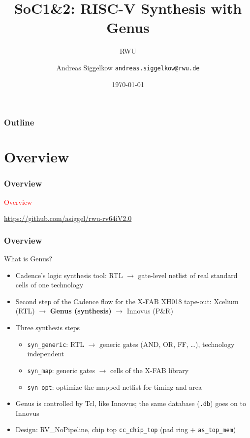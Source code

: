 \documentclass{beamer}
\title{SoC1\&2: RISC-V Synthesis with Genus}
\author[AS]{Andreas Siggelkow \newline \texttt{andreas.siggelkow@rwu.de}}
\date[2026]{\today}
\subtitle{RWU}
\institute{Elektrotechnik und Informatik}
\newcommand{\astitle}{nix}
\newcommand{\assubtitle}{nix}
\newcommand{\cmd}[1]{\texttt{#1}}
\begin{document}
\setcounter{tocdepth}{1}

\begin{frame}
  \titlepage
\end{frame}

\begin{frame}
  \frametitle{Outline}
  \tableofcontents
\end{frame}

\section{Overview}
\renewcommand{\astitle}{Overview}
\begin{frame}
\frametitle{\astitle}
\textcolor{red}{Overview}

\url{https://github.com/asiggel/rwu-rv64iV2.0}
\end{frame}

\renewcommand{\assubtitle}{What is Genus?}
\begin{frame}
\frametitle{\astitle}
\begin{block}{\assubtitle}
  \footnotesize
  \begin{itemize}
    \item Cadence's logic synthesis tool: RTL $\rightarrow$ gate-level netlist
      of real standard cells of one technology
    \item Second step of the Cadence flow for the X-FAB XH018 tape-out:
      Xcelium (RTL) $\rightarrow$ \textbf{Genus (synthesis)} $\rightarrow$ Innovus (P\&R)
    \item Three synthesis steps
    \begin{itemize}
      \item \cmd{syn\_generic}: RTL $\rightarrow$ generic gates (AND, OR, FF, \dots),
        technology independent
      \item \cmd{syn\_map}: generic gates $\rightarrow$ cells of the X-FAB library
      \item \cmd{syn\_opt}: optimize the mapped netlist for timing and area
    \end{itemize}
    \item Genus is controlled by Tcl, like Innovus;
      the same database (\cmd{.db}) goes on to Innovus
    \item Design: RV\_NoPipeline, chip top \cmd{cc\_chip\_top}
      (pad ring + \cmd{as\_top\_mem})
  \end{itemize}
\end{block}
\end{frame}
\end{document}
